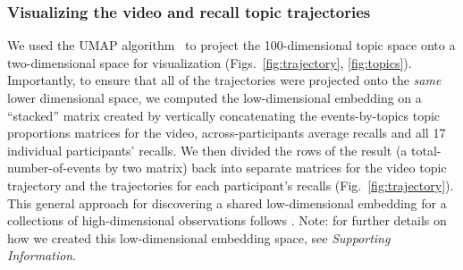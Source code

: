 \documentclass{article}
\begin{document}
\subsubsection*{Visualizing the video and recall topic trajectories}
We used the UMAP algorithm~\citep{McInEtal18} to project the 100-dimensional topic space onto a two-dimensional space for visualization (Figs.~\ref{fig:trajectory}, \ref{fig:topics}).  Importantly, to ensure that all of the trajectories were projected onto the \textit{same} lower dimensional space, we computed the low-dimensional embedding on a ``stacked'' matrix created by vertically concatenating the events-by-topics topic proportions matrices for the video, across-participants average recalls and all 17 individual participants' recalls.  We then divided the rows of the result (a total-number-of-events by two matrix) back into separate matrices for the video topic trajectory and the trajectories for each participant's recalls (Fig.~\ref{fig:trajectory}).  This general approach for discovering a shared low-dimensional embedding for a collections of high-dimensional observations follows \cite{HeusEtal18a}.  Note: for further details on how we created this low-dimensional embedding space, see \textit{Supporting Information}.
\end{document}
